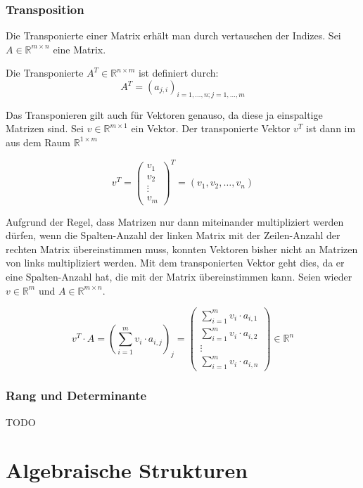 \subsubsection{Transposition}

Die Transponierte einer Matrix erhält man durch vertauschen der Indizes. Sei $A \in \mathbb{R}^{m\times n} $ eine Matrix. 

\begin{definition}
Die Transponierte $A^T \in \mathbb{R}^{n\times m}$ ist definiert durch:
\[
	A^T = (a_{j,i})_{i=1,\dots, n; j=1,\dots, m}
\]
\end{definition}
Das Transponieren gilt auch für Vektoren genauso, da diese ja einspaltige Matrizen sind. Sei $v\in \mathbb{R}^{m\times 1}$ ein Vektor. Der transponierte Vektor $v^T$ ist dann im aus dem Raum $\mathbb{R}^{1\times m}$

\[
v^T = \begin{pmatrix}
v_1\\
v_2\\
\vdots \\
v_m
\end{pmatrix}^T = (v_1, v_2, \dots , v_n)
\]

Aufgrund der Regel, dass Matrizen nur dann miteinander multipliziert werden dürfen, wenn die Spalten-Anzahl der linken Matrix mit der Zeilen-Anzahl der rechten Matrix übereinstimmen muss, konnten Vektoren bisher nicht an Matrizen von links multipliziert werden. Mit dem transponierten Vektor geht dies, da er eine Spalten-Anzahl hat, die mit der Matrix übereinstimmen kann. Seien wieder $v\in \mathbb{R}^m$ und $A\in \mathbb{R}^{m\times n}$.

\[
v^T \cdot A = (\sum_{i=1}^{m}v_i\cdot a_{i,j})_{j} = \begin{pmatrix}
\sum_{i=1}^{m}v_i\cdot a_{i,1} \\
\sum_{i=1}^{m}v_i\cdot a_{i,2} \\
\vdots \\
\sum_{i=1}^{m}v_i\cdot a_{i,n}
\end{pmatrix} \in \mathbb{R}^n
\]

\subsubsection{Rang und Determinante}

TODO

\section{Algebraische Strukturen}

